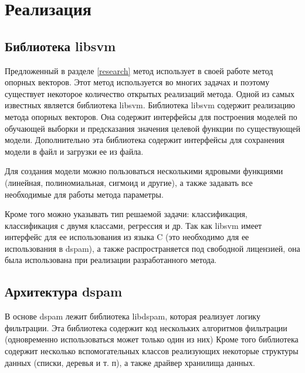 \newpage
\section{Реализация}

\subsection{Библиотека libsvm}
Предложенный в разделе \ref{research} метод использует в своей работе метод опорных векторов. Этот метод используется во многих задачах и поэтому существует некоторое количество открытых реализаций метода. Одной из самых известных является библиотека libsvm\cite{LIBSVM}.
Библиотека libsvm содержит реализацию метода опорных векторов. Она содержит интерфейсы для построения моделей по обучающей выборки и предсказания значения целевой функции по  существующей модели. Дополнительно эта библиотека содержит интерфейсы для сохранения модели в файл и загрузки ее из файла.

Для создания модели можно пользоваться несколькими ядровыми функциями (линейная, полиномиальная, сигмоид и другие), а также задавать все необходимые для работы метода параметры.

Кроме того можно указывать тип решаемой задачи: классификация, классификация с двумя классами, регрессия и др.
Так как libsvm имеет интерфейс для ее использования из языка C (это необходимо для ее использования в dspam), а также распространяется под свободной лицензией, она была использована при реализации разработанного метода.


\subsection{Архитектура dspam}
В основе dspam лежит библиотека libdspam, которая реализует логику фильтрации.
Эта библиотека содержит код нескольких алгоритмов фильтрации (одновременно использоваться может только один из них)
Кроме того библиотека содержит несколько вспомогательных классов реализующих некоторые структуры данных (списки, деревья и т. п), а также драйвер хранилища данных.

